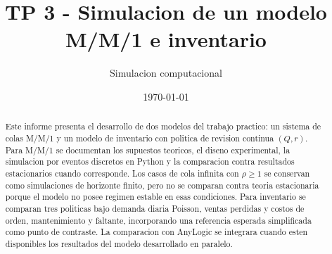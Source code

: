 \documentclass[11pt]{article}
\title{TP 3 - Simulacion de un modelo M/M/1 e inventario}
\author{Simulacion computacional}
\date{\today}
\begin{document}
\maketitle
\begin{abstract}
Este informe presenta el desarrollo de dos modelos del trabajo practico: un sistema de colas M/M/1 y un modelo de inventario con politica de revision continua $(Q,r)$. Para M/M/1 se documentan los supuestos teoricos, el diseno experimental, la simulacion por eventos discretos en Python y la comparacion contra resultados estacionarios cuando corresponde. Los casos de cola infinita con $\rho \geq 1$ se conservan como simulaciones de horizonte finito, pero no se comparan contra teoria estacionaria porque el modelo no posee regimen estable en esas condiciones. Para inventario se comparan tres politicas bajo demanda diaria Poisson, ventas perdidas y costos de orden, mantenimiento y faltante, incorporando una referencia esperada simplificada como punto de contraste. La comparacion con AnyLogic se integrara cuando esten disponibles los resultados del modelo desarrollado en paralelo.
\end{abstract}









\clearpage

\end{document}
